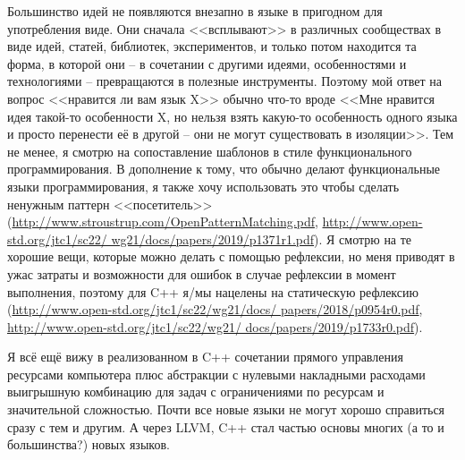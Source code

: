 \documentclass[10pt, a5paper]{article}
\begin{document}
\begin{Parallel}[p]{}{}
{Большинство идей не появляются внезапно в языке в пригодном для употребления виде. Они сначала <<всплывают>> в различных сообществах в виде идей, статей, библиотек, экспериментов, и только потом находится та форма, в которой они – в сочетании с другими идеями, особенностями и технологиями – превращаются в полезные инструменты. Поэтому мой ответ на вопрос <<нравится ли вам язык X>> обычно что-то вроде <<Мне нравится идея такой-то особенности X, но нельзя взять какую-то особенность одного языка и просто перенести её в другой – они не могут существовать в изоляции>>. Тем не менее, я смотрю на сопоставление шаблонов в стиле функционального программирования. В дополнение к тому, что обычно делают функциональные языки программирования, я также хочу использовать это чтобы сделать ненужным паттерн <<посетитель>> (\url{http://www.stroustrup.com/OpenPatternMatching.pdf}, \href{http://www.open-std.org/jtc1/sc22/wg21/docs/papers/2019/p1371r1.pdf}{http://www.open-std.org/jtc1/sc22/ wg21/docs/papers/2019/p1371r1.pdf}). Я смотрю на те хорошие вещи, которые можно делать с помощью рефлексии, но меня приводят в ужас затраты и возможности для ошибок в случае рефлексии в момент выполнения, поэтому для C++ я/мы нацелены на статическую рефлексию (\href{http://www.open-std.org/jtc1/sc22/wg21/docs/papers/2018/p0954r0.pdf}{http://www.open-std.org/jtc1/sc22/wg21/docs/ papers/2018/p0954r0.pdf}, ~ \href{http://www.open-std.org/jtc1/sc22/wg21/docs/papers/2019/p1733r0.pdf}{http://www.open-std.org/jtc1/sc22/wg21/ docs/papers/2019/p1733r0.pdf}). 

Я всё ещё вижу в реализованном в C++ сочетании прямого управления ресурсами компьютера плюс абстракции с нулевыми накладными расходами выигрышную комбинацию для задач с ограничениями по ресурсам и значительной сложностью. Почти все новые языки не могут хорошо справиться сразу с тем и другим.
А через LLVM, C++ стал частью основы многих (а то и большинства?) новых языков.


\vfill

     }
   \end{Parallel}

 
\end{document}
